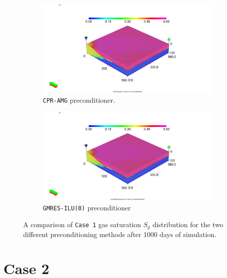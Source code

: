 \begin{figure}
\centering
\begin{subfigure}{.5\textwidth}
  \centering
  \includegraphics[width=1.3\linewidth]{figures/case1_cpr_sgas.png}
  \caption{\texttt{CPR-AMG} preconditioner.}
\end{subfigure}%
\begin{subfigure}{.5\textwidth}
  \centering
  \includegraphics[width=1.3\linewidth]{figures/case1_ilu_sgas.png}
  \caption{\texttt{GMRES-ILU(0)} preconditioner}
\end{subfigure}
\caption{A comparison of \texttt{Case 1} gas saturation $S_{g}$ distribution for the two different preconditioning methods after 1000 days of simulation.}
\label{case1sg}
\end{figure}

\section{Case 2}


